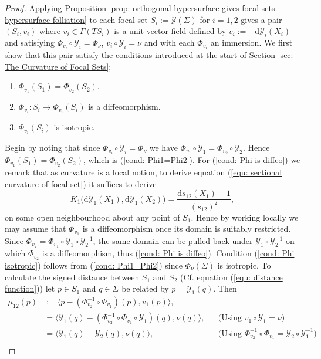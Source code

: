\documentclass[12pt]{amsart}
\theoremstyle{plain}
\theoremstyle{definition}
\newcommand{\td}{\mathrm{d}}
\numberwithin{equation}{section}
\begin{document}
\begin{proof}
    Applying Proposition \ref{prop: orthogonal hypersurface gives focal sets hypersurface folliation} to each focal set $S_i:=\mathcal{Y}(\Sigma)$ for $i=1,2$ gives a pair $(S_i,v_i)$ where $v_i\in\Gamma(TS_i)$ is a unit vector field defined by $v_i:=-\td\mathcal{Y}_i(X_i)$ and satisfying $\Phi_{v_i}\circ \mathcal{Y}_i=\Phi_\nu$, $v_i\circ\mathcal{Y}_i=\nu$ and with each $\Phi_{v_i}$ an immersion. We first show that this pair satisfy the conditions introduced at the start of Section \ref{sec: The Curvature of Focal Sets};
    \begin{enumerate}
    \item $\Phi_{v_1}(S_1)=\Phi_{v_2}(S_2)$.
    \item $\Phi_{v_i}:S_i\to \Phi_{v_i}(S_i)$ is a diffeomorphism.
     \item $\Phi_{v_i}(S_i)$ is isotropic.
\end{enumerate}
Begin by noting that since $\Phi_{v_i}\circ \mathcal{Y}_i=\Phi_\nu$ we have $\Phi_{v_1}\circ \mathcal{Y}_1=\Phi_{v_2}\circ\mathcal{Y}_2$. Hence $\Phi_{v_1}(S_1)=\Phi_{v_2}(S_2)$, which is (\ref{cond: Phi1=Phi2}). For (\ref{cond: Phi is diffeo}) we remark that as curvature is a local notion, to derive equation (\ref{equ: sectional curvature of focal set}) it suffices to derive
\[
K_1\big(\td\mathcal{Y}_1(X_1),\td\mathcal{Y}_1(X_2))=\frac{\td s_{12}(X_1)-1}{(s_{12})^2},
\]
on some open neighbourhood about any point of $S_1$. Hence by working locally we may assume that $\Phi_{v_1}$ is a diffeomorphism once its domain is suitably restricted. Since $\Phi_{v_2}=\Phi_{v_1}\circ \mathcal{Y}_1\circ\mathcal{Y}_2^{-1}$, the same domain can be pulled back under $\mathcal{Y}_1\circ\mathcal{Y}_2^{-1}$ on which $\Phi_{v_2}$ is a diffeomorphism, thus (\ref{cond: Phi is diffeo}). Condition (\ref{cond: Phi isotropic}) follows from (\ref{cond: Phi1=Phi2}) since $\Phi_\nu(\Sigma)$ is isotropic. To calculate the signed distance between $S_1$ and $S_2$ (Cf. equation (\ref{equ: distance function})) let $p\in S_1$ and $q\in\Sigma$ be related by $p=\mathcal{Y}_1(q)$. Then
\begin{align*}
\mu_{12}(p)&:=\langle p-(\Phi_{v_2}^{-1}\circ \Phi_{v_1})(p),v_1(p)\rangle,\\
&=\langle \mathcal{Y}_1(q)-(\Phi_{v_2}^{-1}\circ \Phi_{v_1}\circ\mathcal{Y}_1)(q),\nu(q)\rangle, &&\text{(Using $v_1\circ\mathcal{Y}_1=\nu$)}\\
&=\langle \mathcal{Y}_1(q)-\mathcal{Y}_2(q),\nu(q)\rangle, &&\text{(Using $\Phi_{v_2}^{-1}\circ\Phi_{v_1}=\mathcal{Y}_2\circ\mathcal{Y}_1^{-1}$)}\\

\end{align*}
\end{proof}
\end{document}
